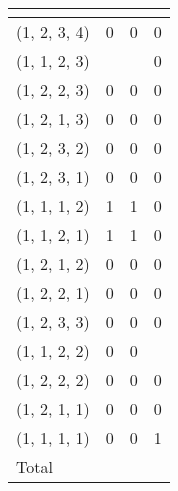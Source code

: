 \documentclass{article}
\begin{document}
\begin{table}[h]
\centering
\begin{tabular}{llll}
\multicolumn{1}{l|}{}        &  &  &  \\ \hline
\multicolumn{1}{l|}{(1, 2, 3, 4)} & 0           & 0        & 0             \\
\multicolumn{1}{l|}{(1, 1, 2, 3)} &              &              & 0             \\
\multicolumn{1}{l|}{(1, 2, 2, 3)} & 0           & 0             & 0             \\
\multicolumn{1}{l|}{(1, 2, 1, 3)} & 0           & 0             & 0             \\
\multicolumn{1}{l|}{(1, 2, 3, 2)} & 0           & 0             & 0             \\
\multicolumn{1}{l|}{(1, 2, 3, 1)} & 0           & 0             & 0             \\
\multicolumn{1}{l|}{(1, 1, 1, 2)} & 1             & 1             & 0             \\
\multicolumn{1}{l|}{(1, 1, 2, 1)} & 1             & 1             & 0             \\
\multicolumn{1}{l|}{(1, 2, 1, 2)} & 0             & 0             & 0             \\
\multicolumn{1}{l|}{(1, 2, 2, 1)} & 0             & 0             & 0             \\
\multicolumn{1}{l|}{(1, 2, 3, 3)} & 0             & 0             & 0        \\
\multicolumn{1}{l|}{(1, 1, 2, 2)} & 0             & 0             &              \\
\multicolumn{1}{l|}{(1, 2, 2, 2)} & 0             & 0             & 0             \\
\multicolumn{1}{l|}{(1, 2, 1, 1)} & 0             & 0             & 0             \\
\multicolumn{1}{l|}{(1, 1, 1, 1)} & 0             & 0             & 1             \\ \hline
\multicolumn{1}{l|}{Total}                             &             &             &           
\end{tabular}
\caption{}
\label{table:mS}
\end{table}

\newpage
\end{document}
